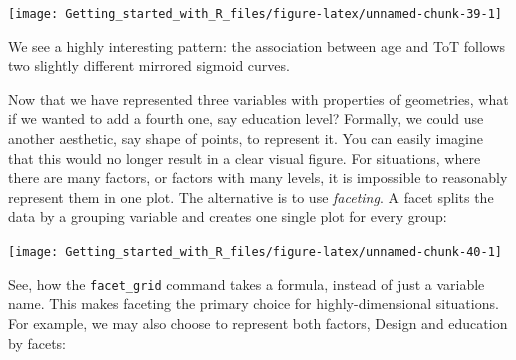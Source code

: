 \documentclass[]{svmono}
\newenvironment{Shaded}{\begin{snugshade}}{\end{snugshade}}
\newcommand{\KeywordTok}[1]{\textcolor[rgb]{0.13,0.29,0.53}{\textbf{#1}}}
\newcommand{\DataTypeTok}[1]{\textcolor[rgb]{0.13,0.29,0.53}{#1}}
\newcommand{\StringTok}[1]{\textcolor[rgb]{0.31,0.60,0.02}{#1}}
\newcommand{\OperatorTok}[1]{\textcolor[rgb]{0.81,0.36,0.00}{\textbf{#1}}}
\newcommand{\NormalTok}[1]{#1}
\begin{document}
\texttt{[image: Getting\_started\_with\_R\_files/figure-latex/unnamed-chunk-39-1]}

We see a highly interesting pattern: the association between age and ToT
follows two slightly different mirrored sigmoid curves.

Now that we have represented three variables with properties of
geometries, what if we wanted to add a fourth one, say education level?
Formally, we could use another aesthetic, say shape of points, to
represent it. You can easily imagine that this would no longer result in
a clear visual figure. For situations, where there are many factors, or
factors with many levels, it is impossible to reasonably represent them
in one plot. The alternative is to use \emph{faceting}. A facet splits
the data by a grouping variable and creates one single plot for every
group:

\begin{Shaded}
\end{Shaded}

\texttt{[image: Getting\_started\_with\_R\_files/figure-latex/unnamed-chunk-40-1]}

See, how the \texttt{facet\_grid} command takes a formula, instead of
just a variable name. This makes faceting the primary choice for
highly-dimensional situations. For example, we may also choose to
represent both factors, Design and education by facets:

\begin{Shaded}
\end{Shaded}
\end{document}
